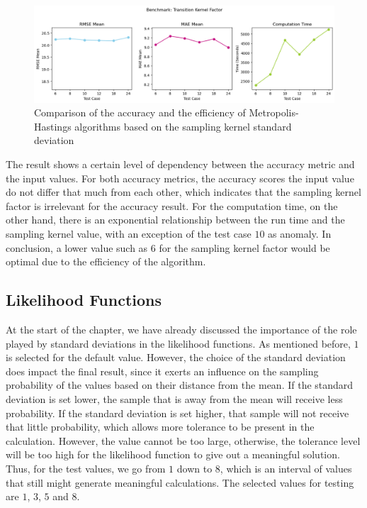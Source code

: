 \begin{figure}[H]
    \centering
    \includegraphics[width=1\textwidth]{figures/basic_mh/benchmark/sensitivity_transition.png}
    \captionsetup{width=.8\textwidth}
    \caption{Comparison of the accuracy and the efficiency of Metropolis-Hastings algorithms based on the sampling kernel standard deviation}
    \label{fig:enter-label}
\end{figure}

The result shows a certain level of dependency between the accuracy metric and the input values. For both accuracy metrics, the accuracy scores the input value do not differ that much from each other, which indicates that the sampling kernel factor is irrelevant for the accuracy result. For the computation time, on the other hand, there is an exponential relationship between the run time and the sampling kernel value, with an exception of the test case $10$ as anomaly. In conclusion, a lower value such as $6$ for the sampling kernel factor would be optimal due to the efficiency of the algorithm.

\subsection{Likelihood Functions}
At the start of the chapter, we have already discussed the importance of the role played by standard deviations in the likelihood functions. As mentioned before, $1$ is selected for the default value. However, the choice of the standard deviation does impact the final result, since it exerts an influence on the sampling probability of the values based on their distance from the mean. If the standard deviation is set lower, the sample that is away from the mean will receive less probability. If the standard deviation is set higher, that sample will not receive that little probability, which allows more tolerance to be present in the calculation. However, the value cannot be too large, otherwise, the tolerance level will be too high for the likelihood function to give out a meaningful solution. Thus, for the test values, we go from $1$ down to $8$, which is an interval of values that still might generate meaningful calculations. The selected values for testing are $1$, $3$, $5$ and $8$. 


